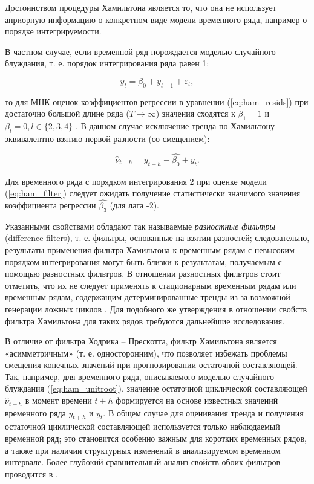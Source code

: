 \documentclass[a4paper,14pt]{extreport}
\begin{document}
	Достоинством процедуры Хамильтона является то, что она не использует априорную информацию о конкретном виде модели временного ряда, например о порядке интегрируемости. 
	
	В частном случае, если временной ряд порождается моделью случайного блуждания, т. е. порядок интегрирования ряда равен 1: 
	
	\begin{equation}
		y_t = \beta_0 + y_{t-1} + \varepsilon_t ,
		\label{eq:ham_unitroot}
	\end{equation}
	
	то для МНК-оценок коэффициентов регрессии в уравнении (\ref{eq:ham_resids}) при достаточно большой длине ряда ($T \rightarrow \infty$) значения сходятся к $\beta_1 = 1$ и $\beta_l = 0, l \in \{2, 3, 4\}$ \cite[с. 16-17]{hamHP}. В данном случае исключение тренда по Хамильтону эквивалентно взятию первой разности (со смещением):
	
	\begin{equation}
		\hat{\nu}_{t+h} = y_{t+h} - \hat{\beta_0} + y_{t} .
		\label{eq:ham_unitroot_resid}
	\end{equation}
	
	Для временного ряда с порядком интегрирования 2 при оценке модели (\ref{eq:ham_filter}) следует ожидать получение статистически значимого значения коэффициента регрессии $\hat{\beta_3}$  (для лага -2).  
	
	Указанными свойствами обладают так называемые \textit{разностные фильтры} (difference filters), т. е. фильтры, основанные на взятии разностей; следовательно, результаты применения фильтра Хамильтона к временным рядам с невысоким порядком интегрирования могут быть близки к результатам, получаемым с помощью разностных фильтров. В отношении разностных фильтров стоит отметить, что их не следует применять к стационарным временным рядам или временным рядам, содержащим детерминированные тренды из-за возможной генерации ложных циклов \cite{schuler_detrend, harvey_detrend}. Для подобного же утверждения в отношении свойств фильтра Хамильтона для таких рядов требуются дальнейшие исследования. 
	
	В отличие от фильтра Ходрика -- Прескотта, фильтр Хамильтона является «асимметричным» (т. е. односторонним), что позволяет избежать проблемы смещения конечных значений при прогнозировании остаточной составляющей. Так, например, для временного ряда, описываемого моделью случайного блуждания (\ref{eq:ham_unitroot}),  значение остаточной циклической составляющей $\hat{\nu}_{t+h}$ в момент времени $t+h$ формируется на основе известных значений временного ряда $y_{t+h}$ и $y_t$. В общем случае для оценивания тренда и получения остаточной циклической составляющей используется только наблюдаемый временной ряд; это становится особенно важным для коротких временных рядов, а также при наличии структурных изменений в анализируемом временном интервале. Более глубокий сравнительный анализ свойств обоих фильтров проводится в \cite{schuler_detrend}.
	
\end{document}
